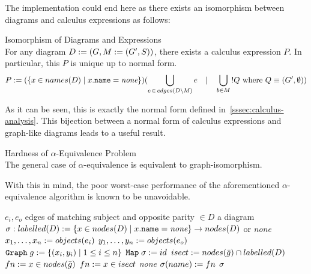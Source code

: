         The implementation could end here as there exists an isomorphism between diagrams and calculus expressions as follows:
        \begin{lemma}{Isomorphism of Diagrams and Expressions\\}
            For any diagram $D := (G, M := (G', S))$, there exists a calculus expression $P$. In particular, this $P$ is unique up to normal form.
            \begin{align*}
                P := (\{x \in names(D) \; | \; x.\texttt{name} = \textit{none}\})(\bigcup_{e \, \in \, edges(D \setminus M)}{e} \quad | \quad \bigcup_{b \in M}{!Q \text{ where } Q \equiv (G', \emptyset)})
            \end{align*}
        \end{lemma}
        As it can be seen, this is exactly the normal form defined in~\ref{sssec:calculus-analysis}.
        This bijection between a normal form of calculus expressions and graph-like diagrams leads to a useful result.

        \begin{corollary*}{Hardness of $\alpha$-Equivalence Problem\\}
            The general case of $\alpha$-equivalence is equivalent to graph-isomorphism.
        \end{corollary*}
        
        With this in mind, the poor worst-case performance of the aforementioned $\alpha$-equivalence algorithm is known to be unavoidable.

        \begin{breakablealgorithm}
            \caption{Fusion of Nodes}
            \begin{algorithmic}[1]
                \Require$e_i, e_o$ edges of matching subject and opposite parity $\in D$ a diagram
                \Ensure$\sigma : labelled(D) := \{x \in nodes(D) \; | \; x.\texttt{name} = \textit{none}\} \rightarrow nodes(D)$ or \textit{none}
                    \State$x_1, \ldots, x_n := objects(e_i)$
                    \State$y_1, \ldots, y_n := objects(e_o)$
                    \State$\texttt{Graph} \; g := \{(x_i, y_i) \; | \; 1 \leq i \leq n\}$
                    \State$\texttt{Map} \; \sigma := id$
                        \State$isect := nodes(\bar{g}) \cap labelled(D)$
                            \State$fn := x \in nodes(\bar{g})$
                            \State$fn := x \in isect$
                        \Else
                            \State\Return\textit{none}
                        \EndIf
                            \State$\sigma(name) := fn$
                        \EndFor
                    \EndFor
                    \State\Return$\sigma$
                \EndFunction
            \end{algorithmic}
        \end{breakablealgorithm}

